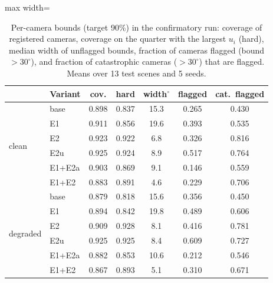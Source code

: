 \begin{table}[!htbp]\centering\footnotesize
\caption{Per-camera bounds (target 90\%) in the confirmatory run: coverage of registered cameras, coverage on the quarter with the largest $u_i$ (hard), median width of unflagged bounds, fraction of cameras flagged (bound $>30^\circ$), and fraction of catastrophic cameras ($>30^\circ$) that are flagged. Means over 13 test scenes and 5 seeds.}\label{tab:v2bounds}
\setlength{\tabcolsep}{2.2pt}\begin{adjustbox}{max width=\textwidth}\begin{tabular}{llccccc}\toprule
 & Variant & cov. & hard & width$^\circ$ & flagged & cat.\ flagged \\\midrule
\multirow{6}{*}{clean} & base & 0.898 & 0.837 & 15.3 & 0.265 & 0.430 \\
 & E1 & 0.911 & 0.856 & 19.6 & 0.393 & 0.535 \\
 & E2 & 0.923 & 0.922 & 6.8 & 0.326 & 0.816 \\
 & E2u & 0.925 & 0.924 & 8.9 & 0.517 & 0.764 \\
 & E1+E2a & 0.903 & 0.869 & 9.1 & 0.146 & 0.559 \\
 & E1+E2 & 0.883 & 0.891 & 4.6 & 0.229 & 0.706 \\
\midrule
\multirow{6}{*}{degraded} & base & 0.879 & 0.818 & 15.6 & 0.356 & 0.450 \\
 & E1 & 0.894 & 0.842 & 19.8 & 0.489 & 0.606 \\
 & E2 & 0.909 & 0.928 & 8.1 & 0.416 & 0.781 \\
 & E2u & 0.925 & 0.925 & 8.4 & 0.609 & 0.727 \\
 & E1+E2a & 0.882 & 0.853 & 10.6 & 0.212 & 0.546 \\
 & E1+E2 & 0.867 & 0.893 & 5.1 & 0.310 & 0.671 \\
\bottomrule\end{tabular}\end{adjustbox}\end{table}
